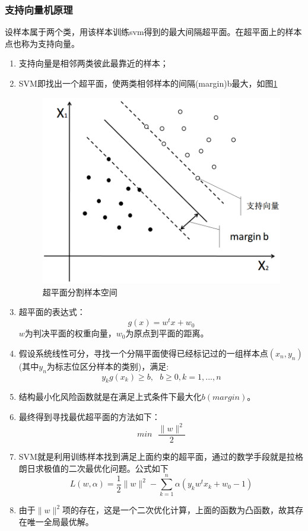\documentclass[UTF8, twocolumn ]{ctexart}
\begin{document}
\subsubsection{支持向量机原理}
设样本属于两个类，用该样本训练svm得到的最大间隔超平面。在超平面上的样本点也称为支持向量。
\begin{enumerate}
\item 支持向量是相邻两类彼此最靠近的样本；
\item SVM即找出一个超平面，使两类相邻样本的间隔(margin)b最大，如图\ref{fig:no7}
  \begin{figure}[!ht]\centering
    \includegraphics[keepaspectratio, scale=0.35]{no7.png}
    \caption{超平面分割样本空间\label{fig:no7}} 
  \end{figure}
\item 超平面的表达式：
  \begin{equation}
    g(x)=w^{t}x+w_{0}
  \end{equation}
  $w$为判决平面的权重向量，$w_{0}$为原点到平面的距离。
\item 假设系统线性可分，寻找一个分隔平面使得已经标记过的一组样本点$(x_{n},y_{n})$(其中$y_{n}$为标志位区分样本的类别)，满足:
  \begin{equation}
    y_{k}g(x_{k})\geqslant b, \ \ \ b\geqslant0,k=1,...,n
  \end{equation}
\item 结构最小化风险函数就是在满足上式条件下最大化$b(margin)$。
\item 最终得到寻找最优超平面的方法如下：
  \begin{equation}
    min \ \ \ \frac{\|w\|^{2}}{2}
  \end{equation}
\item SVM就是利用训练样本找到满足上面约束的超平面，通过的数学手段就是拉格朗日求极值的二次最优化问题。公式如下
  \begin{equation}
    L(w,\alpha)=\frac{1}{2}\|w\|^{2}-\sum_{k=1}^{n}\alpha(y_{k}w^{t}x_{k}+w_{0}-1)
  \end{equation}
\item 由于$\|w\|^{2}$项的存在，这是一个二次优化计算，上面的函数为凸函数，故其存在唯一全局最优解。
\end{enumerate}
\end{document}
